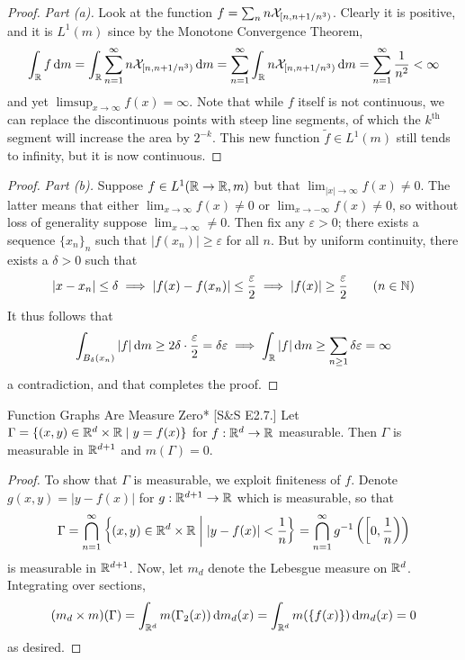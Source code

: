 \begin{proof}
    \textit{Part (a).} Look at the function \(f = \sum_{n} n \mathcal{X}_{[n, n+1/n^3)}\). Clearly it is positive, and it is \(L^1(m)\) since by the Monotone Convergence Theorem, 
    \[
        \int_{\mathbb{R}} f \, \mathrm{d}m
        = \int_{\mathbb{R}} \sum_{n=1}^\infty n \mathcal{X}_{[n, n + 1/n^3)} \, \mathrm{d}m
        = \sum_{n=1}^\infty \int_{\mathbb{R}} n \mathcal{X}_{[n, n + 1/n^3)} \, \mathrm{d}m
        = \sum_{n=1}^\infty \frac{1}{n^2}
        < \infty
    \]
    and yet \(\limsup_{x \to \infty} f(x) = \infty\). Note that while \(f\) itself is not continuous, we can replace the discontinuous points with steep line segments, of which the \(k^{\text{th}}\) segment will increase the area by \(2^{-k}\). This new function \(\tilde{f} \in L^1(m)\) still tends to infinity, but it is now continuous. 
\end{proof}

\begin{proof}
    \textit{Part (b).} Suppose \(f \in L^1(\mathbb{R} \to \mathbb{R}, m)\) but that \(\lim_{|x| \to \infty} f(x) \neq 0\). The latter means that either \(\lim_{x \to \infty} f(x) \neq 0\) or \(\lim_{x \to -\infty} f(x) \neq 0\), so without loss of generality suppose \(\lim_{x \to \infty} \neq 0\). Then fix any \(\varepsilon > 0\); there exists a sequence \(\{x_n\}_n\) such that \(|f(x_n)| \geq \varepsilon\) for all \(n\). But by uniform continuity, there exists a \(\delta > 0\) such that 
    \[
        |x - x_n| \leq \delta \implies |f(x) - f(x_n)| \leq \frac{\varepsilon}{2} \implies |f(x)| \geq \frac{\varepsilon}{2}
        \qquad (n \in \mathbb{N})
    \]
    It thus follows that 
    \[
    \int_{B_{\delta}(x_n)} |f| \, \mathrm{d}m \geq 2\delta \cdot \frac{\varepsilon}{2} = \delta \varepsilon
    \implies \int_{\mathbb{R}} |f| \, \mathrm{d}m \geq \sum_{n \geq 1} \delta \varepsilon = \infty
    \]
    a contradiction, and that completes the proof. 
\end{proof}

\begin{problem}{Function Graphs Are Measure Zero}*
    [S\&S E2.7.] Let \(\Gamma = \{(x, y) \in \mathbb{R}^d \times \mathbb{R} \mid y = f(x) \}\) for \(f : \mathbb{R}^d \to \mathbb{R}\) measurable. Then \(\Gamma\) is measurable in \(\mathbb{R}^{d+1}\) and \(m(\Gamma) = 0\).
\end{problem}

\begin{proof}
    To show that \(\Gamma\) is measurable, we exploit finiteness of \(f\). Denote \(g(x, y) = |y - f(x)|\) for \(g : \mathbb{R}^{d+1} \to \mathbb{R}\) which is measurable, so that
    \[
        \Gamma 
        = \bigcap_{n=1}^\infty \left\{ (x, y) \in \mathbb{R}^d \times \mathbb{R} \;\biggr\rvert\; |y - f(x)| < \frac{1}{n} \right\}
        = \bigcap_{n=1}^\infty g^{-1}\left(\left[0, \frac{1}{n}\right)\right)
    \]
    is measurable in \(\mathbb{R}^{d+1}\). Now, let \(m_d\) denote the Lebesgue measure on \(\mathbb{R}^d\). Integrating over sections, 
    \[
        (m_d \times m)(\Gamma)
        = \int_{\mathbb{R}^d} m(\Gamma_2(x)) \, \mathrm{d}m_d(x)
        = \int_{\mathbb{R}^d} m(\{f(x)\}) \, \mathrm{d}m_d(x)
        = 0
    \]
    as desired. 
\end{proof}

